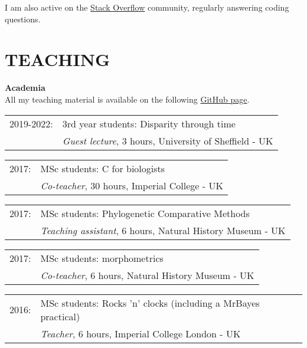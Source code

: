 \documentclass[10pt,a4paper]{article}
\begin{document}
{I am also active on the \href{https://stackoverflow.com/users/9281298/thomas-guillerme}{Stack Overflow} community, regularly answering coding questions.


\section{TEACHING}
\bigskip

\raggedright\textbf{Academia}\\[1.5ex]
All my teaching material is available on the following \href{https://github.com/TGuillermeTeaching}{GitHub page}.

\begin{tabular}{ll}
2019-2022: & 3rd year students: Disparity through time\\
           & \textit{Guest lecture}, 3 hours, University of Sheffield - UK \\
\end{tabular}

\begin{tabular}{ll}
2017: & MSc students: C for biologists\\
      & \textit{Co-teacher}, 30 hours, Imperial College - UK \\
\end{tabular}

\begin{tabular}{ll}
2017: & MSc students: Phylogenetic Comparative Methods\\
      & \textit{Teaching assistant}, 6 hours, Natural History Museum - UK \\
\end{tabular}

\begin{tabular}{ll}
2017: & MSc students: morphometrics\\
      & \textit{Co-teacher}, 6 hours, Natural History Museum - UK \\
\end{tabular}

\begin{tabular}{ll}
2016: & MSc students: Rocks 'n' clocks (including a MrBayes practical)\\
      & \textit{Teacher}, 6 hours, Imperial College London - UK \\
\end{tabular}

}
\end{document}
